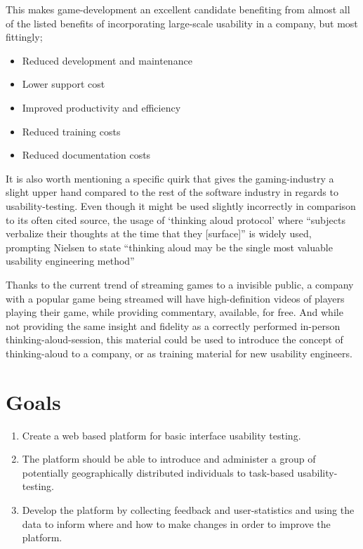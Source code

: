   This makes game-development an excellent candidate benefiting from almost all
  of the listed benefits of incorporating large-scale usability in a company,
  but most fittingly;
  \begin{itemize}
    \item{Reduced development and maintenance}
    \item{Lower support cost}
    \item{Improved productivity and efficiency}
    \item{Reduced training costs}
    \item{Reduced documentation costs}
  \end{itemize}

  It is also worth mentioning a specific quirk that gives the gaming-industry a
  slight upper hand compared to the rest of the software industry in regards to
  usability-testing. Even though it might be used slightly
  incorrectly\cite{citeThinkAloud} in comparison to its often cited
  source\cite{ProtocolanalysisVerbalReportsAsData}, the usage of `thinking
  aloud protocol' where ``subjects verbalize their thoughts at the time that
  they [surface]''\cite[p. 60]{ProtocolanalysisVerbalReportsAsData} is widely
  used, prompting Nielsen to state ``thinking aloud may be the single most
  valuable usability engineering method''\cite[p. 195]{citeHeuristicsNielsenUsabilityEngineering}

  Thanks to the current trend of streaming games to a invisible public, a
  company with a popular game being streamed will have high-definition videos
  of players playing their game, while providing commentary, available, for
  free. And while not providing the same insight and fidelity as a correctly
  performed in-person thinking-aloud-session, this material could be used to
  introduce the concept of thinking-aloud to a company, or as training
  material for new usability
  engineers\cite{citeYouTubeGamersandThinkAloudProtocolsIntroducingUsabilityTesting}.

\section{Goals}


  \begin{enumerate}
    \item{
      Create a web based platform for basic interface usability testing.
    }
    \item {
      The platform should be able to introduce and administer a group of
      potentially geographically distributed individuals to task-based
      usability-testing.
    }
    \item{
      Develop the platform by collecting feedback and user-statistics and using
      the data to inform where and how to make changes in order to improve the
      platform.
    }
  \end{enumerate}
